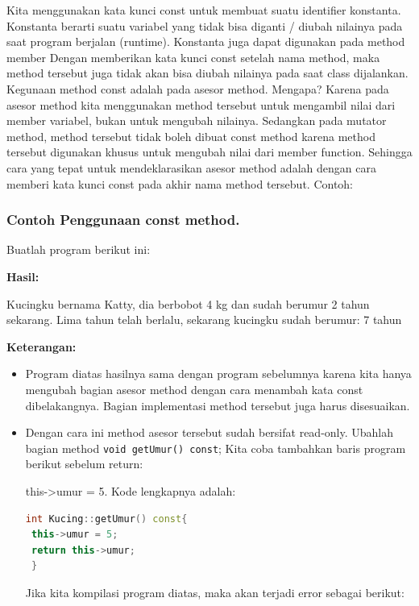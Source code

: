 Kita menggunakan kata kunci const untuk membuat suatu identifier
konstanta. Konstanta berarti suatu variabel yang tidak bisa diganti /
diubah nilainya pada saat program berjalan (runtime). Konstanta juga
dapat digunakan pada method member Dengan memberikan kata kunci const
setelah nama method, maka method tersebut juga tidak akan bisa diubah
nilainya pada saat class dijalankan. Kegunaan method const adalah pada
asesor method. Mengapa? Karena pada asesor method kita menggunakan
method tersebut untuk mengambil nilai dari member variabel, bukan untuk
mengubah nilainya. Sedangkan pada mutator method, method tersebut tidak
boleh dibuat const method karena method tersebut digunakan khusus untuk
mengubah nilai dari member function. Sehingga cara yang tepat untuk
mendeklarasikan asesor method adalah dengan cara memberi kata kunci
const pada akhir nama method tersebut. Contoh:



\subsubsection*{Contoh Penggunaan const method.}

Buatlah program berikut ini:



\textbf{Hasil:}
\begin{lcverbatim}
Kucingku bernama Katty,
dia berbobot 4 kg dan sudah
berumur 2 tahun sekarang.
Lima tahun telah berlalu,
 sekarang kucingku sudah berumur: 7 tahun
\end{lcverbatim}


\textbf{Keterangan:}

\begin{itemize}
\item
 Program diatas hasilnya sama dengan program sebelumnya karena kita
 hanya mengubah bagian asesor method dengan cara menambah kata const
 dibelakangnya. Bagian implementasi method tersebut juga harus
 disesuaikan.
\item
 Dengan cara ini method asesor tersebut sudah bersifat read-only.
 Ubahlah bagian method \texttt{void\ getUmur()\ const}; Kita coba
 tambahkan baris program berikut sebelum return:

 this-\textgreater{}umur = 5.
 Kode lengkapnya adalah:

 \begin{lstlisting}[language=c++, numbers=none]
 int Kucing::getUmur() const{
 this->umur = 5;
 return this->umur;
 }
 \end{lstlisting}

 Jika kita kompilasi program diatas, maka akan terjadi error sebagai
 berikut:

 \begin{figure}[htbp]
 \centering
{}

 \end{figure}
\end{itemize}



